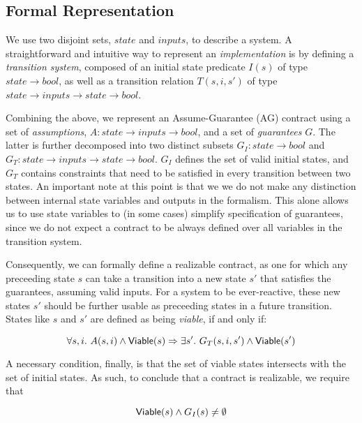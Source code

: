 \subsection{Formal Representation}
\label{sec:formals}
We use two disjoint sets, $state$ and $inputs$, to describe a system.
A straightforward and intuitive way to represent an \emph{implementation} is by
defining a \emph{transition system}, composed of an initial state
predicate $I(s)$ of type $state \to bool$, as well as a transition relation
$T(s,i,s')$ of type $state \to inputs \to state \to bool$.

Combining the above, we represent an Assume-Guarantee (AG) contract using a set
of \emph{assumptions}, $A: state \rightarrow inputs \rightarrow bool$,
and a set of \emph{guarantees} $G$. The latter is further decomposed into two
distinct subsets $G_I: state \rightarrow bool$ and $G_T: state \rightarrow
inputs \rightarrow state \rightarrow bool$. $G_I$ defines the set of valid
initial states, and $G_T$ contains constraints that need to be satisfied in
every transition between two states. An important note at this point is that we
we do not make any distinction between internal state variables and outputs in the
formalism. This alone allows us to use state variables to (in some cases)
simplify specification of guarantees, since we do not expect a contract
to be always defined over all variables in the transition system.

Consequently, we can formally define a realizable contract, as one for which any
preceeding state $s$ can take a transition into a new state $s'$ that satisfies
the guarantees, assuming valid inputs. For a system to be ever-reactive, these
new states $s'$ should be further usable as preceeding states in a future
transition. States like $s$ and $s'$ are defined as being \textit{viable}, if
and only if:

\begin{equation}
\forall s,i.~ A(s, i) \land {\mathsf {Viable}}(s) \Rightarrow \exists s'.~ G_T(s, i,s')
\land {\mathsf {Viable}}(s')
\label{eq:viable}
\end{equation}

A necessary condition, finally, is that the set of viable states
intersects with the set of initial states. As such, to conclude that a contract
is realizable, we require that

\begin{equation}
{\mathsf {Viable}}(s) \land G_I(s) \neq \emptyset
\label{eq:nonempty}
\end{equation}

